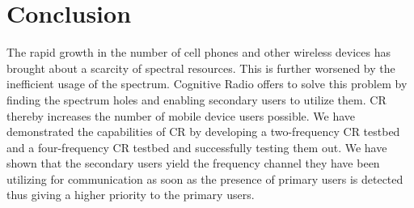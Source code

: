 \chapter{Conclusion}

The rapid growth in the number of cell phones and other wireless devices has 
brought about a scarcity of spectral resources. This is further worsened by the
inefficient usage of the spectrum. Cognitive Radio offers to solve this problem
by finding the spectrum holes and enabling secondary users to utilize them. CR 
thereby increases the number of mobile device users possible. We have 
demonstrated the capabilities of CR by developing a two-frequency CR testbed and
a four-frequency CR testbed and successfully testing them out.  We have shown
that the secondary users yield the frequency channel they have been utilizing
for communication as soon as the presence of primary users is detected thus
giving a higher priority to the primary users.
